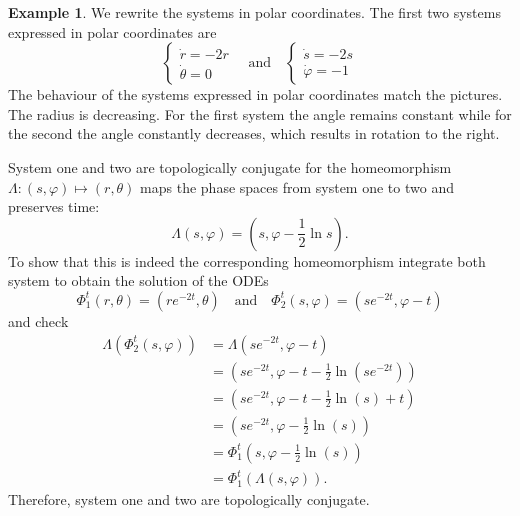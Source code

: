 \documentclass[hidelinks,a4paper, 11pt]{article}
\theoremstyle{plain}
\theoremstyle{break}
\theoremstyle{plain}
\theoremstyle{definition}
\newtheorem*{example}{Example}
\begin{document}
\begin{example}
	We rewrite the systems in polar coordinates. The first two systems expressed in polar coordinates are
	\[
		\begin{cases}
			\dot r = -2r \\
			\dot \theta = 0
		\end{cases} \quad \text{and} \quad 
		\begin{cases}
			\dot s = -2s \\
			\dot \varphi = -1
		\end{cases}
	\]
	The behaviour of the systems expressed in polar coordinates match the pictures. The radius is decreasing. For the first system the angle remains constant while for the second the angle constantly decreases, which results in rotation to the right.
	
	System one and two are topologically conjugate for the homeomorphism $\Lambda: (s,\varphi) \mapsto (r, \theta)$ maps the phase spaces from system one to two and preserves time:
	\[
		\Lambda(s, \varphi) = (s, \varphi - \frac{1}{2}\ln s).
	\]
	To show that this is indeed the corresponding homeomorphism integrate both system to obtain the solution of the ODEs
	\[
		\Phi^t_1(r, \theta) = (re^{-2t}, \theta) \quad \text{and} \quad \Phi^t_2(s, \varphi) = (se^{-2t}, \varphi-t)
	\]
	and check
	\begin{align*}
		\Lambda(\Phi^t_2(s, \varphi)) 
		&= \Lambda(se^{-2t}, \varphi -t) \\
		&= (se^{-2t}, \varphi - t- \frac{1}{2}\ln(se^{-2t})) \\
		&= (se^{-2t}, \varphi - t- \frac{1}{2}\ln(s) + t) \\
		&= (se^{-2t}, \varphi - \frac{1}{2}\ln(s))\\
		&= \Phi^t_1(s, \varphi - \frac{1}{2} \ln(s)) \\
		&= \Phi^t_1(\Lambda(s, \varphi)).
	\end{align*}
	Therefore, system one and two are topologically conjugate.
	

\end{example}
\end{document}
